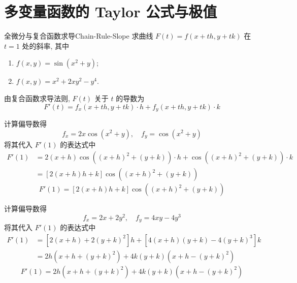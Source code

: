 \section{多变量函数的 Taylor 公式与极值}

\begin{problem}{全微分与复合函数求导}{Chain-Rule-Slope}
    求曲线 $F(t) = f(x + th, y + tk)$ 在 $t = 1$ 处的斜率, 其中
    \begin{enumerate}
        \item $f(x, y) = \sin(x^{2} + y)$;
        \item $f(x, y) = x^{2} + 2xy^{2} - y^{4}$.
    \end{enumerate}
\end{problem}

\begin{solution}
    由复合函数求导法则, $F(t)$ 关于 $t$ 的导数为
    \begin{equation}
        F'(t) = f_{x}(x+th, y+tk) \cdot h + f_{y}(x+th, y+tk) \cdot k
    \end{equation}


    计算偏导数得
    \begin{equation}
        f_{x} = 2x \cos(x^2 + y), \quad f_{y} = \cos(x^2 + y)
    \end{equation}
    将其代入 $F'(1)$ 的表达式中
    \begin{equation}
        \begin{aligned}
            F'(1) & = 2(x+h) \cos((x+h)^2 + (y+k)) \cdot h + \cos((x+h)^2 + (y+k)) \cdot k \\
                  & = [2(x+h)h + k] \cos((x+h)^2 + (y+k))
        \end{aligned}
    \end{equation}
    \begin{equation}
        \boxed{F'(1) = [2(x+h)h + k] \cos((x+h)^2 + (y+k))}
    \end{equation}


    计算偏导数得
    \begin{equation}
        f_{x} = 2x + 2y^2, \quad f_{y} = 4xy - 4y^3
    \end{equation}
    将其代入 $F'(1)$ 的表达式中
    \begin{equation}
        \begin{aligned}
            F'(1) & = [2(x+h) + 2(y+k)^2]h + [4(x+h)(y+k) - 4(y+k)^3]k \\
                  & = 2h(x + h + (y+k)^2) + 4k(y+k)(x + h - (y+k)^2)
        \end{aligned}
    \end{equation}
    \begin{equation}
        \boxed{F'(1) = 2h(x + h + (y+k)^2) + 4k(y+k)(x + h - (y+k)^2)}
    \end{equation}
\end{solution}


